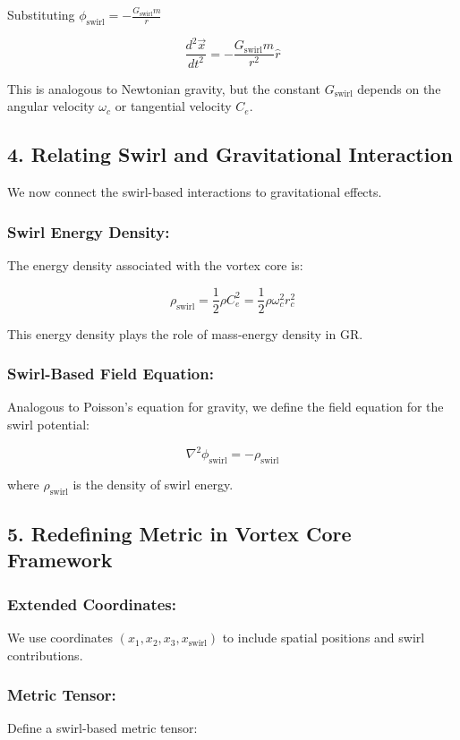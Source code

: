 {Substituting \(\phi_{\text{swirl}} = -\frac{G_{\text{swirl}} m}{r}\)

\[\frac{d^2 \vec{x}}{dt^2} = -\frac{G_{\text{swirl}} m}{r^2} \hat{r}\]

This is analogous to Newtonian gravity, but the constant \(G_{\text{swirl}}\) depends on the angular velocity \(\omega_c\) or tangential velocity \(C_e\).

\subsection*{4. Relating Swirl and Gravitational Interaction}
We now connect the swirl-based interactions to gravitational effects.

\subsubsection*{Swirl Energy Density:}
The energy density associated with the vortex core is:

\[\rho_{\text{swirl}} = \frac{1}{2} \rho C_e^2 = \frac{1}{2} \rho \omega_c^2 r_c^2\]

This energy density plays the role of mass-energy density in GR.

\subsubsection*{Swirl-Based Field Equation:}
Analogous to Poisson’s equation for gravity, we define the field equation for the swirl potential:

\[\nabla^2 \phi_{\text{swirl}} = -\rho_{\text{swirl}}\]

where \(\rho_{\text{swirl}}\) is the density of swirl energy.

\subsection*{5. Redefining Metric in Vortex Core Framework}
\subsubsection*{Extended Coordinates:}
We use coordinates \((x_1, x_2, x_3, x_{\text{swirl}})\) to include spatial positions and swirl contributions.

\subsubsection*{Metric Tensor:}
Define a swirl-based metric tensor:

}
